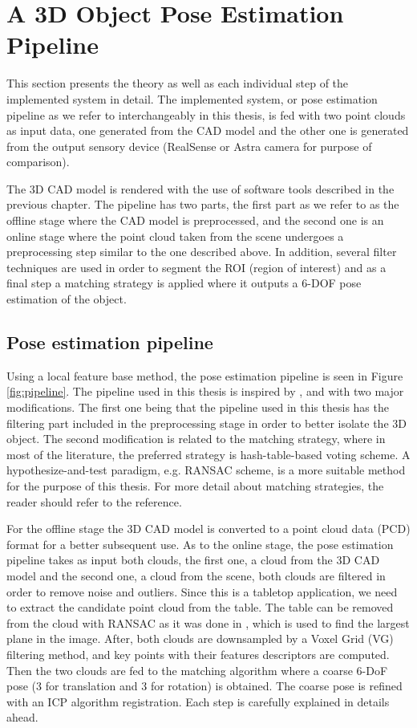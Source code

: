 
\chapter{A 3D Object Pose Estimation Pipeline}
\label{chap:theo}
This section presents the theory as well as each individual step of the implemented system in detail. The implemented system, or pose estimation pipeline as we refer to interchangeably in this thesis, is fed with two point clouds as input data, one generated from the CAD model and the other one is generated from the output sensory device (RealSense or Astra camera for purpose of comparison).

The 3D CAD model is rendered with the use of software tools described in the previous chapter. The pipeline has two parts, the first part as we refer to as the offline stage where the CAD model is preprocessed, and the second one is an online stage where the point cloud taken from the scene undergoes a preprocessing step similar to the one described above. In addition, several filter techniques are used in order to segment the ROI (region of interest) and as a final step a matching strategy is applied where it outputs a 6-DOF pose estimation of the object.  

\section{Pose estimation pipeline}
Using a local feature base method, the pose estimation pipeline is seen in Figure \ref{fig:pipeline}. The pipeline used in this thesis is inspired by \cite{cadPipeline1}, \cite{cadPipeline2} and \cite{cadPipeline3} with two major modifications. The first one being that the pipeline used in this thesis has the filtering part included in the preprocessing stage in order to better isolate the 3D object. The second modification is related to the matching strategy\cite{repMatching}, where in most of the literature, the preferred strategy is hash-table-based voting scheme. A hypothesize-and-test paradigm\cite{repMatching}, e.g. RANSAC scheme, is a more suitable method for the purpose of this thesis. For more detail about matching strategies, the reader should refer to the reference. 

For the offline stage the 3D CAD model is converted to a point cloud data (PCD) format for a better subsequent use. As to the online stage, the pose estimation pipeline takes as input both clouds, the first one, a cloud from the 3D CAD model and the second one, a cloud from the scene, both clouds are filtered in order to remove noise and outliers. Since this is a tabletop application, we need to extract the candidate point cloud from the table. The table can be removed from the cloud with RANSAC as it was done in \cite{cadPipeline3}, which is used to find the largest plane in the image. After, both clouds are downsampled by a Voxel Grid (VG) filtering method, and key points with their features descriptors are computed. Then the two clouds are fed to the matching algorithm where a coarse 6-DoF pose (3 for translation and 3 for rotation) is obtained. The coarse pose is refined with an ICP algorithm registration. Each step is carefully explained in details ahead. 

